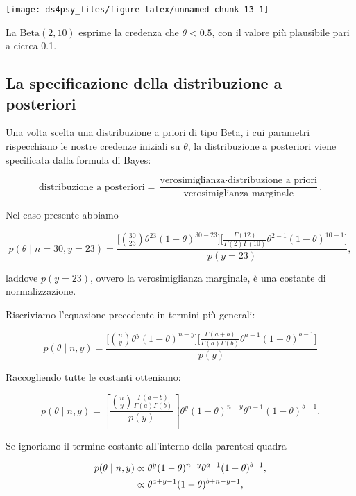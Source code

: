 \documentclass[
  11pt,
]{krantz}
\theoremstyle{definition}
\theoremstyle{definition}
\theoremstyle{definition}
\theoremstyle{definition}
\theoremstyle{remark}
\begin{document}
\begin{center}\texttt{[image: ds4psy\_files/figure-latex/unnamed-chunk-13-1]} \end{center}

La \(\mbox{Beta}(2, 10)\) esprime la credenza che \(\theta < 0.5\), con il valore più plausibile pari a cicrca 0.1.

\hypertarget{la-specificazione-della-distribuzione-a-posteriori}{%
\subsection{La specificazione della distribuzione a posteriori}\label{la-specificazione-della-distribuzione-a-posteriori}}

Una volta scelta una distribuzione a priori di tipo Beta, i cui parametri rispecchiano le nostre credenze iniziali su \(\theta\), la distribuzione a posteriori viene specificata dalla formula di Bayes:

\[
\text{distribuzione a posteriori} = \frac{\text{verosimiglianza}\cdot\text{distribuzione a priori}}{\text{verosimiglianza marginale}}.
\]

Nel caso presente abbiamo

\[
p(\theta \mid n=30, y=23) = \frac{\Big[\binom{30}{23}\theta^{23}(1-\theta)^{30-23}\Big]\Big[\frac{\Gamma(12)}{\Gamma(2)\Gamma(10)}\theta^{2-1} (1-\theta)^{10-1}\Big]}{p(y = 23)},
\]

laddove \(p(y = 23)\), ovvero la verosimiglianza marginale, è una costante di normalizzazione.

Riscriviamo l'equazione precedente in termini più generali:

\[
p(\theta \mid n, y) = \frac{\Big[\binom{n}{y}\theta^{y}(1-\theta)^{n-y}\Big]\Big[\frac{\Gamma(a+b)}{\Gamma(a)\Gamma(b)}\theta^{a-1} (1-\theta)^{b-1}\Big]}{p(y)}
\]

Raccogliendo tutte le costanti otteniamo:

\[
p(\theta \mid n, y) =\left[\frac{\binom{n}{y}\frac{\Gamma(a+b)}{\Gamma(a)\Gamma(b)}}{p(y)}\right] \theta^{y}(1-\theta)^{n-y}\theta^{a-1} (1-\theta)^{b-1}.
\]

Se ignoriamo il termine costante all'interno della parentesi quadra

\begin{align}
p(\theta \mid n, y) &\propto \theta^{y}(1-\theta)^{n-y}\theta^{a-1} (1-\theta)^{b-1},\notag\\
&\propto \theta^{a+y-1}(1-\theta)^{b+n-y-1},\notag
\end{align}
\end{document}
